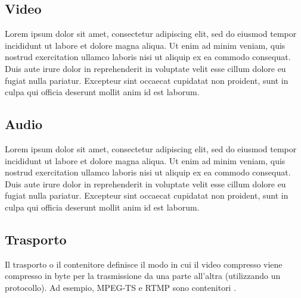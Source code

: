 \subsection{Video}
Lorem ipsum dolor sit amet, consectetur adipiscing elit, sed do eiusmod tempor incididunt ut labore et dolore magna aliqua. Ut enim ad minim veniam, quis nostrud exercitation ullamco laboris nisi ut aliquip ex ea commodo consequat. Duis aute irure dolor in reprehenderit in voluptate velit esse cillum dolore eu fugiat nulla pariatur. Excepteur sint occaecat cupidatat non proident, sunt in culpa qui officia deserunt mollit anim id est laborum.

\subsection{Audio}
Lorem ipsum dolor sit amet, consectetur adipiscing elit, sed do eiusmod tempor incididunt ut labore et dolore magna aliqua. Ut enim ad minim veniam, quis nostrud exercitation ullamco laboris nisi ut aliquip ex ea commodo consequat. Duis aute irure dolor in reprehenderit in voluptate velit esse cillum dolore eu fugiat nulla pariatur. Excepteur sint occaecat cupidatat non proident, sunt in culpa qui officia deserunt mollit anim id est laborum.

\subsection{Trasporto}
Il trasporto o il contenitore definisce il modo in cui il video compresso viene compresso in byte per la trasmissione da una parte all'altra (utilizzando un protocollo). Ad esempio, MPEG-TS e RTMP sono contenitori \parencite{CombinedICTTechnologies}.

